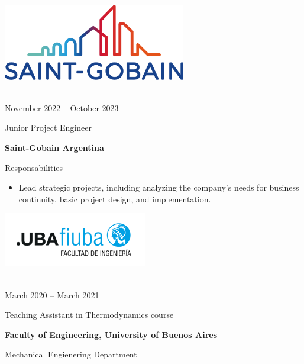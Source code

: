 \documentclass[a4paper,10pt]{article}
\newlength{\cvcolumngapwidth}
\newlength{\cvleftcolumnwidth}
\newlength{\cvrightcolumnwidth}
\newcommand{\cvtitlestyle}[1]{{\large\cvtitlefont\textcolor{cvtitlecolor}{#1}}}
\newcommand{\cvdurationstyle}[1]{{\small\cvdurationfont\textcolor{cvdurationcolor}{#1}}}
\newlength{\cvafteritemskipamount}
\newlength{\cvaftertitleskipamount}
\newlength{\cvparskip}
\newcommand{\cvitem}[2]{
    \begin{minipage}[t]{\cvleftcolumnwidth}
        \raggedleft #1
    \end{minipage}%
    \hspace{\cvcolumngapwidth}%
    \begin{minipage}[t]{\cvrightcolumnwidth}
        \setlength{\parskip}{\cvparskip} #2
    \end{minipage}

    \vspace{\cvafteritemskipamount}
}
\newcommand{\cvtitle}[1]{
    \cvtitlestyle{#1}

    \vspace{\cvaftertitleskipamount}
    \vspace{-\cvparskip}
}
\begin{document}
\cvitem{
 	\begin{minipage}{\textwidth}
   \begin{flushright}
		  \includegraphics[width=0.6\textwidth]{../logos-photos/Logo_SG.png}   
    \end{flushright}  
  \end{minipage} \\
  \vspace{0.3cm}
  \cvdurationstyle{November 2022 -- October 2023}
}{
    \cvtitle{Junior Project Engineer}

    \textbf{\large Saint-Gobain Argentina}
	
  Responsabilities	
    \begin{itemize}
        \item Lead strategic projects, including analyzing the company's needs for business continuity, basic project
          design, and implementation.
    \end{itemize}
	

}

\cvitem{
 	\begin{minipage}{\textwidth}
   \begin{flushright}
		  \includegraphics[height=0.25\textwidth]{../logos-photos/Logo_FIUBA_new.png}   
    \end{flushright}  
  \end{minipage} \\
  \vspace{0.1cm}
  \cvdurationstyle{March 2020 -- March 2021}
}{
    \cvtitle{Teaching Assistant in Thermodynamics course}

    \textbf{\large Faculty of Engineering, University of Buenos Aires}

    Mechanical Engienering Department
}
\end{document}
